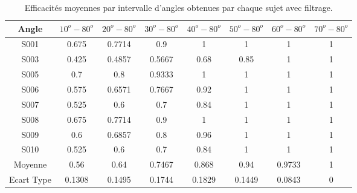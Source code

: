 \documentclass[letterpaper, twoside, 12pt, memoire, creativecommons, hyperref]{thETS}
\begin{document}
\begin{table}[ht]
	\caption{Efficacités moyennes par intervalle d'angles obtenues par chaque sujet avec filtrage. }
		\begin{tabular}{|c|c|c|c|c|c|c|c|}
		\hline
			Angle & $10^{o}-80^{o}$ & $20^{o}-80^{o}$ & $30^{o}-80^{o}$ & $40^{o}-80^{o}$ & $50^{o}-80^{o}$ & $60^{o}-80^{o}$ & $70^{o}-80^{o}$ \\
	    \hline
	    		S001 & 0.675 & 0.7714 & 0.9 & 1 & 1 & 1 & 1\\
	    \hline
	    		S003  & 0.425 & 0.4857 & 0.5667 & 0.68 & 0.85 & 1 & 1\\
	    \hline
	    		S005  & 0.7 & 0.8 & 0.9333 & 1 & 1 & 1 & 1\\
	    \hline
	    		S006 & 0.575 & 0.6571 & 0.7667 & 0.92 & 1 & 1 & 1\\
	    \hline
	    		S007 & 0.525 & 0.6 & 0.7 & 0.84 & 1 & 1 & 1\\
	    \hline
	    		S008 & 0.675 & 0.7714 & 0.9 & 1 & 1 & 1 & 1\\
	    \hline
	    		S009 & 0.6 & 0.6857 & 0.8 & 0.96 & 1 & 1 & 1\\
	    \hline
	    		S010 & 0.525 & 0.6 & 0.7 & 0.84 & 1 & 1 & 1\\
	    \hline
	    		Moyenne  & 0.56 & 0.64 & 0.7467 & 0.868 & 0.94 & 0.9733 & 1\\
	    \hline
	    		Ecart Type & 0.1308 & 0.1495 & 0.1744 & 0.1829 & 0.1449 & 0.0843 & 0\\
	    \hline
		\end{tabular}
	\label{tab:effinterval}
\end{table}
\end{document}
